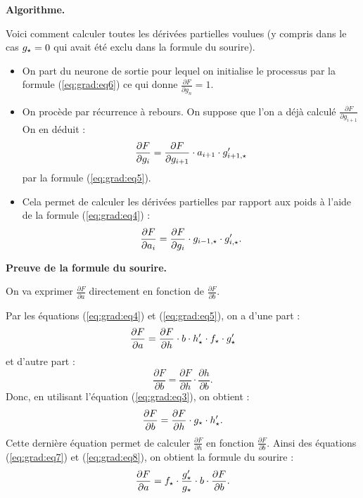 \bigskip
\textbf{Algorithme.}


Voici comment calculer toutes les dérivées partielles voulues (y compris dans le cas $g_\star=0$ qui avait été exclu dans la formule du sourire).
\begin{itemize}
	\item On part du neurone de sortie pour lequel on initialise le processus par la formule
	(\ref{eq:grad:eq6}) ce qui donne 
	$\frac{\partial F}{\partial g_n} = 1$.
	\item On procède par récurrence à rebours. On suppose que l'on a déjà calculé
	$\frac{\partial F}{\partial g_{i+1}}$
	On en déduit :
	$$\frac{\partial F}{\partial g_{i}} =  \frac{\partial F}{\partial g_{i+1}} \cdot a_{i+1} \cdot  g'_{i+1,\star}$$
	par la formule (\ref{eq:grad:eq5}).
	\item Cela permet de calculer les dérivées partielles par rapport aux poids à l'aide de la formule (\ref{eq:grad:eq4}) :
	$$\frac{\partial F}{\partial a_i} = \frac{\partial F}{\partial g_i} \cdot g_{i-1,\star} \cdot  g'_{i,\star}.$$
\end{itemize}



\bigskip
\textbf{Preuve de la formule du sourire.}

On va exprimer $\frac{\partial F}{\partial a}$ directement en fonction de $\frac{\partial F}{\partial b}$.

Par les équations (\ref{eq:grad:eq4}) et (\ref{eq:grad:eq5}), on a d'une part :
\begin{equation}
	\frac{\partial F}{\partial a} =   \frac{\partial F}{\partial h} \cdot b \cdot  h'_\star \cdot f_\star \cdot g'_\star
	\label{eq:grad:eq7}
\end{equation}
et d'autre part :
$$\frac{\partial F}{\partial b} =  \frac{\partial F}{\partial h} \cdot \frac{\partial h}{\partial b}.$$
Donc, en utilisant l'équation (\ref{eq:grad:eq3}), on obtient :
\begin{equation}
	\frac{\partial F}{\partial b} =   \frac{\partial F}{\partial h} \cdot g_\star \cdot  h'_\star.
	\label{eq:grad:eq8}
\end{equation}
Cette dernière équation permet de calculer $\frac{\partial F}{\partial h}$ en fonction $\frac{\partial F}{\partial b}$. Ainsi des équations (\ref{eq:grad:eq7}) et (\ref{eq:grad:eq8}), on obtient la formule du sourire :
$$\frac{\partial F}{\partial a} = f_\star \cdot \frac{g'_\star}{g_\star} \cdot b \cdot \frac{\partial F}{\partial b}.$$

